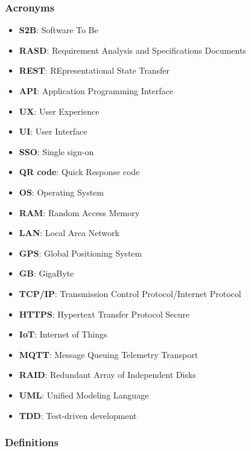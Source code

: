 \subsubsection{Acronyms}

\begin{itemize}
    \item \textbf{S2B}: Software To Be
    \item \textbf{RASD}: Requirement Analysis and Specifications Documents
    \item \textbf{REST}: REpresentational State Transfer
    \item \textbf{API}: Application Programming Interface
    \item \textbf{UX}: User Experience
    \item \textbf{UI}: User Interface
    \item \textbf{SSO}: Single sign-on
    \item \textbf{QR code}: Quick Response code
    \item \textbf{OS}: Operating System
    \item \textbf{RAM}: Random Access Memory
    \item \textbf{LAN}: Local Area Network
    \item \textbf{GPS}: Global Positioning System
    \item \textbf{GB}: GigaByte
    \item \textbf{TCP/IP}: Transmission Control Protocol/Internet Protocol
    \item \textbf{HTTPS}: Hypertext Transfer Protocol Secure
    \item \textbf{IoT}: Internet of Things
    \item \textbf{MQTT}: Message Queuing Telemetry Transport
    \item \textbf{RAID}: Redundant Array of Independent Disks
    \item \textbf{UML}: Unified Modeling Language
    \item \textbf{TDD}: Test-driven development
\end{itemize}

\vfill
\pagebreak

\subsubsection{Definitions}


